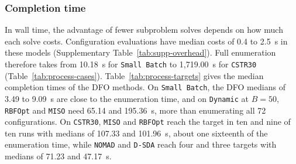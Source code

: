\documentclass{article}
\begin{document}
\subsubsection{Completion time}
In wall time, the advantage of fewer subproblem solves depends on how much each solve costs.
Configuration evaluations have median costs of 0.4 to 2.5~s in these models (Supplementary Table~\ref{tab:supp-overhead}).
Full enumeration therefore takes from 10.18~s for \texttt{Small Batch} to 1,719.00~s for \texttt{CSTR30} (Table~\ref{tab:process-cases}).
Table~\ref{tab:process-targets} gives the median completion times of the DFO methods.
On \texttt{Small Batch}, the DFO medians of 3.49 to 9.09~s are close to the enumeration time, and on \texttt{Dynamic} at \(B=50\), \texttt{RBFOpt} and \texttt{MISO} need 65.14 and 195.36~s, more than enumerating all 72 configurations.
On \texttt{CSTR30}, \texttt{MISO} and \texttt{RBFOpt} reach the target in ten and nine of ten runs with medians of 107.33 and 101.96~s, about one sixteenth of the enumeration time, while \texttt{NOMAD} and \texttt{D-SDA} reach four and three targets with medians of 71.23 and 47.17~s.
\end{document}
